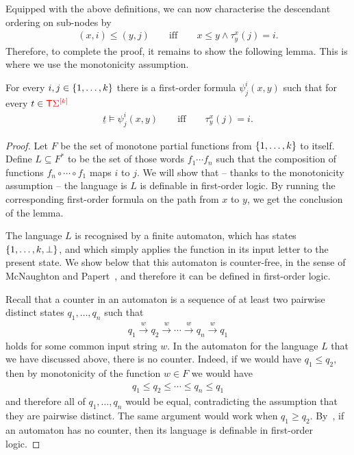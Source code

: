 Equipped with the above definitions, we can now characterise the descendant ordering on sub-nodes by
\begin{align*}
    (x,i) \le (y,j) \qquad \text{iff} \qquad x \le y \land \tau_y^x(j)=i.
\end{align*}
Therefore, to complete the proof, it remains to show the following lemma. This is where we use the monotonicity assumption.

\begin{lemma}\label{lem:counter-free}
    For every $i,j \in \{1,\ldots,k\}$ 
    there is a first-order formula $\psi_j^i(x,y)$ such that for every $t  \in {\color{red}{\mathsf T}} {\color{red}{\Sigma}}^{{\color{red}{[k]}}}$
    \begin{align*}
    \underline t \models \psi_j^i(x,y) \qquad \text{iff} \qquad \tau_y^x(j)=i.
    \end{align*}
\end{lemma}
\begin{proof}
    Let $F$ be the set of monotone partial functions  from $\{1,\ldots,k\}$ to itself. Define $L \subseteq F^*$ to be the set of those words $f_1 \cdots f_n$ such that the composition of functions $f_n\circ \cdots \circ f_1$ maps $i$ to $j$. We will show that -- thanks to the monotonicity assumption -- the language is $L$ is definable in first-order logic. By running the corresponding first-order  formula on the path from $x$ to $y$, we get the conclusion of the lemma.   
    
    
    The language $L$ is recognised by a finite automaton, which has states $\{1,\ldots,k,\bot\}$, and which simply applies the function in its input letter to the present state. We show below that this automaton is counter-free, in the sense of McNaughton and Papert~\cite[p.~6]{McNaughtonPapert71}, and therefore it can be defined in first-order logic. 

    Recall that a counter in an automaton is a sequence of at least two pairwise distinct states $q_1,\ldots,q_n$ such that
    \begin{align*}
    q_1  \stackrel w \to q_2 \stackrel w \to \cdots \stackrel w \to q_n \stackrel w \to q_1
    \end{align*}
    holds for some common input string $w$. In the automaton for the language $L$ that we have discussed above, there is no counter. Indeed, if we would have $q_1 \le q_2$, then by monotonicity of the function   $w \in F$ we would have 
    \begin{align*}
    q_1 \le q_2 \le \cdots \le q_n \le q_1
    \end{align*}
    and therefore all of $q_1,\ldots,q_n$ would be equal, contradicting the assumption that they are pairwise distinct. The same argument would work when $q_1 \ge q_2$. By~\cite[Theorem 10.5]{McNaughtonPapert71}, if an automaton has no counter, then its language is definable in first-order logic. 
    
\end{proof}